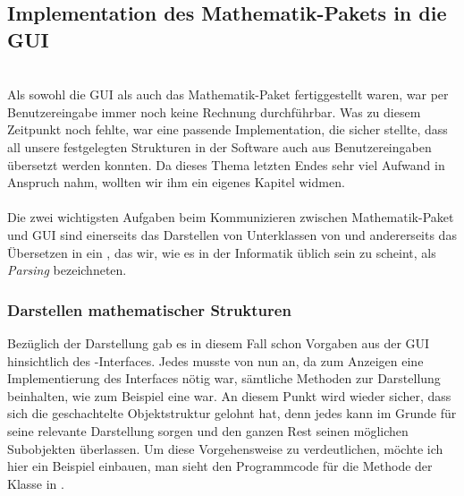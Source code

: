 \subsection{Implementation des Mathematik-Pakets in die GUI}\ \\
Als sowohl die GUI als auch das Mathematik-Paket fertiggestellt waren, war per Benutzereingabe immer noch keine Rechnung durchführbar. Was zu diesem Zeitpunkt noch fehlte, war eine passende Implementation, die sicher stellte, dass all unsere festgelegten Strukturen in der Software auch aus Benutzereingaben übersetzt werden konnten. Da dieses Thema letzten Endes sehr viel Aufwand in Anspruch nahm, wollten wir ihm ein eigenes Kapitel widmen.\\
\\
Die zwei wichtigsten Aufgaben beim Kommunizieren zwischen Mathematik-Paket und GUI sind einerseits das Darstellen von Unterklassen von  und andererseits das Übersetzen in ein , das wir, wie es in der Informatik üblich sein zu scheint, als \textit{Parsing} bezeichneten.

\subsubsection{Darstellen mathematischer Strukturen}
Bezüglich der Darstellung gab es in diesem Fall schon Vorgaben aus der GUI hinsichtlich des -Interfaces. Jedes  musste von nun an, da zum Anzeigen eine Implementierung des Interfaces nötig war, sämtliche Methoden zur Darstellung beinhalten, wie zum Beispiel  eine war. An diesem Punkt wird wieder sicher, dass sich die geschachtelte Objektstruktur gelohnt hat, denn jedes  kann im Grunde für seine relevante Darstellung sorgen und den ganzen Rest seinen möglichen Subobjekten überlassen. Um diese Vorgehensweise zu verdeutlichen, möchte ich hier ein Beispiel einbauen, man sieht den Programmcode für die Methode der Klasse in .\\


